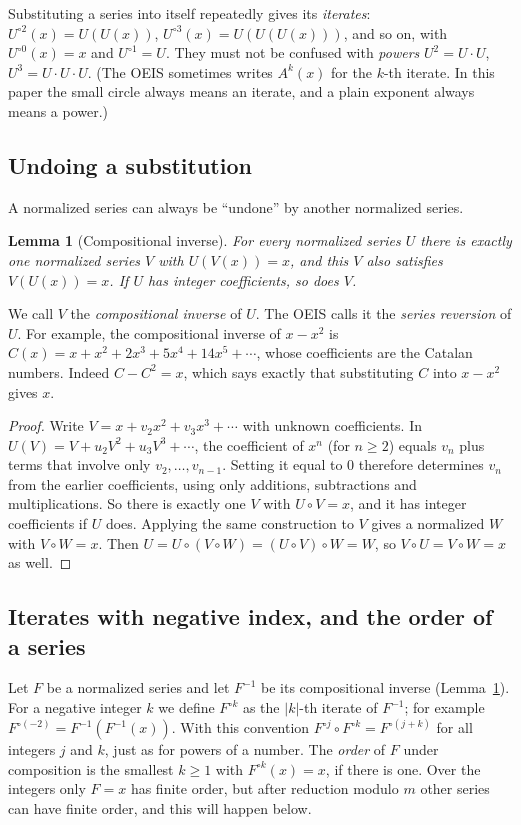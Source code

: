 \documentclass[11pt,a4paper]{article}
\newtheorem{lemma}[theorem]{Lemma}
\theoremstyle{definition}
\theoremstyle{remark}
\begin{document}
Substituting a series into itself repeatedly gives its \emph{iterates}: $U^{\circ2}(x)=U(U(x))$,
$U^{\circ3}(x)=U(U(U(x)))$, and so on, with $U^{\circ0}(x)=x$ and $U^{\circ1}=U$. They must not be confused with
\emph{powers} $U^2=U\cdot U$, $U^3=U\cdot U\cdot U$. (The OEIS sometimes writes $A^k(x)$ for the $k$-th iterate. In
this paper the small circle always means an iterate, and a plain exponent always means a power.)

\subsection{Undoing a substitution}
A normalized series can always be ``undone'' by another normalized series.

\begin{lemma}[Compositional inverse]\label{lem:inverse}
For every normalized series $U$ there is exactly one normalized series $V$ with $U(V(x))=x$, and this $V$ also
satisfies $V(U(x))=x$. If $U$ has integer coefficients, so does $V$.
\end{lemma}

We call $V$ the \emph{compositional inverse} of $U$. The OEIS calls it the \emph{series reversion} of $U$. For example,
the compositional inverse of $x-x^2$ is $C(x)=x+x^2+2x^3+5x^4+14x^5+\cdots$, whose coefficients are the Catalan numbers.
Indeed $C-C^2=x$, which says exactly that substituting $C$ into $x-x^2$ gives $x$.

\begin{proof}
Write $V=x+v_2x^2+v_3x^3+\cdots$ with unknown coefficients. In
$U(V)=V+u_2V^2+u_3V^3+\cdots$, the coefficient of $x^n$ (for $n\ge2$) equals $v_n$ plus terms that involve only
$v_2,\dots,v_{n-1}$. Setting it equal to $0$ therefore determines $v_n$ from the earlier coefficients, using only
additions, subtractions and multiplications. So there is exactly one $V$ with $U\circ V=x$, and it has integer
coefficients if $U$ does. Applying the same construction to $V$ gives a normalized $W$ with $V\circ W=x$. Then
$U=U\circ(V\circ W)=(U\circ V)\circ W=W$, so $V\circ U=V\circ W=x$ as well.
\end{proof}

\subsection{Iterates with negative index, and the order of a series}
Let $F$ be a normalized series and let $F^{-1}$ be its compositional inverse (Lemma~\ref{lem:inverse}). For a
negative integer $k$ we define $F^{\circ k}$ as the $|k|$-th iterate of $F^{-1}$; for example
$F^{\circ(-2)}=F^{-1}(F^{-1}(x))$. With this convention $F^{\circ j}\circ F^{\circ k}=F^{\circ(j+k)}$ for all integers
$j$ and $k$, just as for powers of a number. The \emph{order} of $F$ under composition is the smallest $k\ge1$ with
$F^{\circ k}(x)=x$, if there is one. Over the integers only $F=x$ has finite order, but after reduction modulo $m$
other series can have finite order, and this will happen below.
\end{document}
